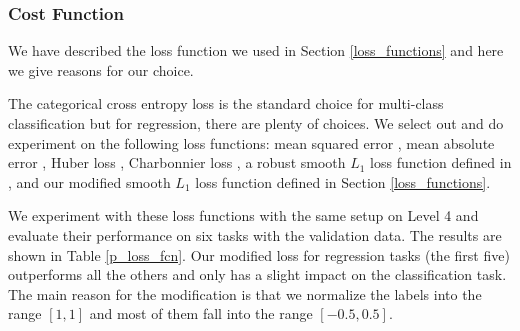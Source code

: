 \documentclass[a4paper,12pt]{article}
\begin{document}
\subsubsection{Cost Function}

We have described the loss function we used in Section \ref{loss_functions} and here we give reasons for our choice.

The categorical cross entropy loss is the standard choice for multi-class classification but for regression, there are plenty of choices. We select out and do experiment on the following loss functions:  mean squared error \cite{4775883}, mean absolute error \cite{2005ClRes3079W}, Huber loss \cite{huber1964}, Charbonnier loss \cite{413553},  a robust smooth $L_1$ loss function defined in \cite{DBLP:journals/corr/Girshick15}, and our modified smooth $L_1$ loss function defined in Section \ref{loss_functions}.

We experiment with these loss functions with the same setup on Level 4 and evaluate their performance on six tasks with the validation data. The results are shown in Table \ref{p_loss_fcn}. Our modified loss for regression tasks (the first five) outperforms all the others and only has a slight impact on the classification task. The main reason for the modification is that we normalize the labels into the range $[1, 1]$ and most of them fall into the range $[-0.5, 0.5]$. 
\end{document}
